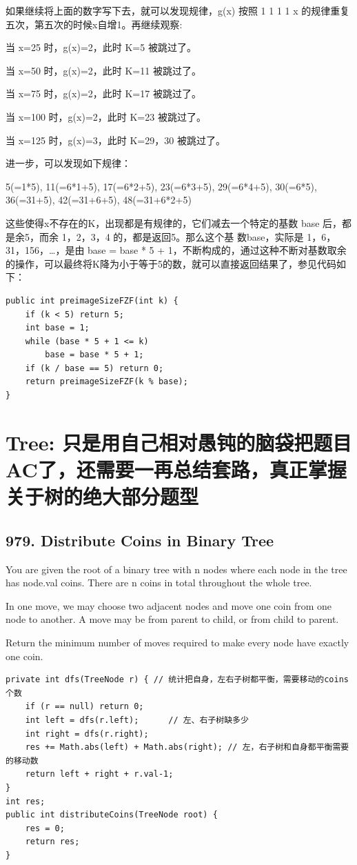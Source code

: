 \documentclass[9pt, b5paper]{article}
\begin{document}
如果继续将上面的数字写下去，就可以发现规律，g(x) 按照 1 1 1 1 x 的规律重复五次，第五次的时候x自增1。再继续观察:

当 x=25 时，g(x)=2，此时 K=5 被跳过了。

当 x=50 时，g(x)=2，此时 K=11 被跳过了。

当 x=75 时，g(x)=2，此时 K=17 被跳过了。

当 x=100 时，g(x)=2，此时 K=23 被跳过了。

当 x=125 时，g(x)=3，此时 K=29，30 被跳过了。

进一步，可以发现如下规律：

5(=1*5), 11(=6*1+5), 17(=6*2+5), 23(=6*3+5), 29(=6*4+5), 30(=6*5), 36(=31+5), 42(=31+6+5), 48(=31+6*2+5)

这些使得x不存在的K，出现都是有规律的，它们减去一个特定的基数 base 后，都是余5，而余 1，2，3，4 的，都是返回5。那么这个基 数base，实际是 1，6，31，156，\ldots{}，是由 base = base * 5 + 1，不断构成的，通过这种不断对基数取余的操作，可以最终将K降为小于等于5的数，就可以直接返回结果了，参见代码如下：
\begin{verbatim}
public int preimageSizeFZF(int k) {
    if (k < 5) return 5;
    int base = 1;
    while (base * 5 + 1 <= k) 
        base = base * 5 + 1;
    if (k / base == 5) return 0;
    return preimageSizeFZF(k % base);
}
\end{verbatim}

\section{Tree: 只是用自己相对愚钝的脑袋把题目AC了，还需要一再总结套路，真正掌握关于树的绝大部分题型}
\label{sec-15}
\subsection{979. Distribute Coins in Binary Tree}
\label{sec-15-1}
You are given the root of a binary tree with n nodes where each node in the tree has node.val coins. There are n coins in total throughout the whole tree.

In one move, we may choose two adjacent nodes and move one coin from one node to another. A move may be from parent to child, or from child to parent.

Return the minimum number of moves required to make every node have exactly one coin.
\begin{verbatim}
private int dfs(TreeNode r) { // 统计把自身，左右子树都平衡，需要移动的coins个数
    if (r == null) return 0;
    int left = dfs(r.left);      // 左、右子树缺多少
    int right = dfs(r.right);
    res += Math.abs(left) + Math.abs(right); // 左，右子树和自身都平衡需要的移动数
    return left + right + r.val-1;
}
int res;
public int distributeCoins(TreeNode root) {
    res = 0;
    return res;
}
\end{verbatim}
\end{document}
